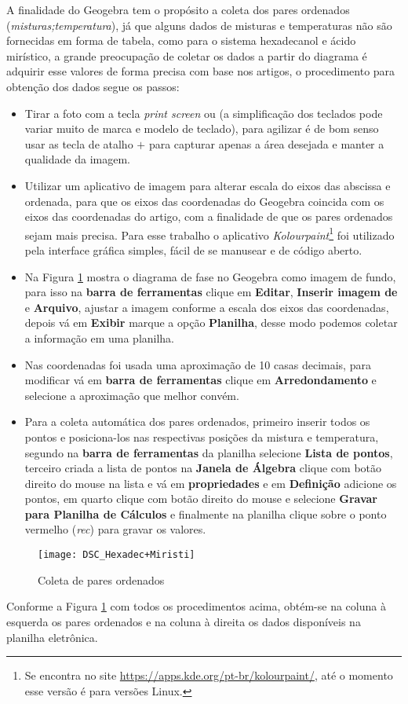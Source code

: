 A finalidade do Geogebra tem o propósito a coleta dos pares ordenados  (\textit{misturas;temperatura}), já que alguns dados de misturas e temperaturas não são fornecidas em forma de tabela, como para o sistema hexadecanol e ácido mirístico, a grande preocupação de coletar os dados a partir do diagrama é adquirir esse valores de forma precisa com base nos artigos, o procedimento para obtenção dos dados segue os passos: 
\begin{itemize}
    \item Tirar a foto com a tecla \textit{print screen} ou  (a simplificação dos teclados pode variar muito de marca e modelo de teclado), para agilizar é de bom senso usar as tecla de atalho \Shift$+$ para capturar apenas a área desejada e manter a qualidade da imagem.
    \item Utilizar um aplicativo de imagem para alterar escala do eixos das abscissa e ordenada, para que os eixos das coordenadas do Geogebra coincida com os eixos das coordenadas do artigo, com a finalidade de que os pares ordenados sejam mais precisa. Para esse trabalho o aplicativo \textit{Kolourpaint}\footnote{Se encontra no site \url{https://apps.kde.org/pt-br/kolourpaint/}, até o momento esse versão é para versões Linux.} foi utilizado pela interface gráfica simples, fácil de se manusear e de código aberto.
    \item Na Figura \ref{fig:DSC_Hexadec+Miristi} mostra o diagrama de fase no Geogebra como imagem de fundo, para isso na \textbf{barra de ferramentas} clique em \textbf{Editar}, \textbf{Inserir imagem de} e \textbf{Arquivo}, ajustar a imagem conforme a escala dos eixos das coordenadas, depois vá em \textbf{Exibir} marque a opção \textbf{Planilha}, desse modo podemos coletar a informação em uma planilha.
    \item Nas coordenadas foi usada uma aproximação de 10 casas decimais, para modificar vá em \textbf{barra de ferramentas} clique em \textbf{Arredondamento} e selecione a aproximação que melhor convém.
    \item Para a coleta automática dos pares ordenados, primeiro inserir todos os pontos e posiciona-los nas respectivas posições da mistura e temperatura, segundo na \textbf{barra de ferramentas} da planilha selecione \textbf{Lista de pontos}, terceiro criada a lista de pontos na \textbf{Janela de Álgebra} clique com botão direito do mouse na lista e vá em \textbf{propriedades} e em \textbf{Definição} adicione os pontos, em quarto clique com botão direito do mouse e selecione \textbf{Gravar para Planilha de Cálculos} e finalmente na planilha clique sobre o ponto vermelho (\textit{rec}) para gravar os valores.
\end{itemize}
\begin{figure}[H]
	\centering
	\texttt{[image: DSC\_Hexadec+Miristi]}
	\caption[Geogebra coleta de pares ordenados]{Coleta de pares ordenados}
	\label{fig:DSC_Hexadec+Miristi}
\end{figure}
Conforme a Figura \ref{fig:DSC_Hexadec+Miristi} com todos os procedimentos acima, obtém-se na coluna à esquerda os pares ordenados e na coluna à direita os dados disponíveis na planilha eletrônica.

